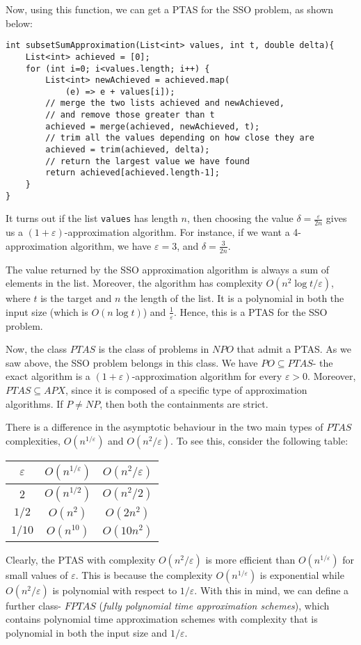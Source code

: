 \documentclass[a4paper, openany]{memoir}
\begin{document}
    Now, using this function, we can get a PTAS for the SSO problem, as shown below:
\begin{lstlisting}[language=pseudocode]
int subsetSumApproximation(List<int> values, int t, double delta){
    List<int> achieved = [0];
    for (int i=0; i<values.length; i++) {
        List<int> newAchieved = achieved.map(
            (e) => e + values[i]);
        // merge the two lists achieved and newAchieved, 
        // and remove those greater than t
        achieved = merge(achieved, newAchieved, t);
        // trim all the values depending on how close they are
        achieved = trim(achieved, delta);
        // return the largest value we have found
        return achieved[achieved.length-1];
    }
}
\end{lstlisting}
    It turns out if the list \texttt{values} has length $n$, then choosing the value $\delta = \frac{\varepsilon}{2n}$ gives us a $(1 + \varepsilon)$-approximation algorithm. For instance, if we want a 4-approximation algorithm, we have $\varepsilon = 3$, and $\delta = \frac{3}{2n}$. 

    The value returned by the SSO approximation algorithm is always a sum of elements in the list. Moreover, the algorithm has complexity $O(n^2 \log t/\varepsilon)$, where $t$ is the target and $n$ the length of the list. It is a polynomial in both the input size (which is $O(n \log t)$) and $\frac{1}{\varepsilon}$. Hence, this is a PTAS for the SSO problem.

    Now, the class $PTAS$ is the class of problems in $NPO$ that admit a PTAS. As we saw above, the SSO problem belongs in this class. We have $PO \subseteq PTAS$- the exact algorithm is a $(1 + \varepsilon)$-approximation algorithm for every $\varepsilon > 0$. Moreover, $PTAS \subseteq APX$, since it is composed of a specific type of approximation algorithms. If $P \neq NP$, then both the containments are strict. 

    There is a difference in the asymptotic behaviour in the two main types of $PTAS$ complexities, $O(n^{1/\varepsilon})$ and $O(n^2/\varepsilon)$. To see this, consider the following table:
    \begin{table}[H]
        \centering
        \begin{tabular}{c|cc}
            $\varepsilon$ & $O(n^{1/\varepsilon})$ & $O(n^2/\varepsilon)$ \\
            \hline
            2 & $O(n^{1/2})$ & $O(n^2/2)$ \\
            $1/2$ & $O(n^2)$ & $O(2n^2)$ \\
            $1/10$ & $O(n^{10})$ & $O(10n^2)$
        \end{tabular}
    \end{table}
    \noindent Clearly, the PTAS with complexity $O(n^2/\varepsilon)$ is more efficient than $O(n^{1/\varepsilon})$ for small values of $\varepsilon$. This is because the complexity $O(n^{1/\varepsilon})$ is exponential while $O(n^2/\varepsilon)$ is polynomial with respect to $1/\varepsilon$. With this in mind, we can define a further class- $FPTAS$ (\emph{fully polynomial time approximation schemes}), which contains polynomial time approximation schemes with complexity that is polynomial in both the input size and $1/\varepsilon$.
\end{document}
